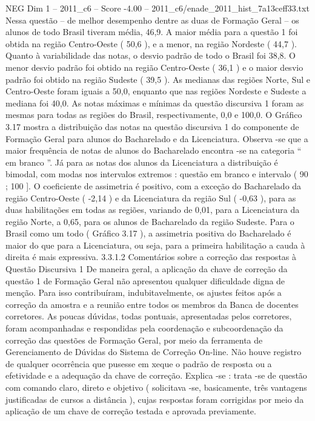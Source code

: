 \begin{textsample}{NEG Dim 1 – 2011\_c6 – Score -4.00 – 2011\_c6/enade\_2011\_hist\_7a13ceff33.txt}
Nessa questão – de melhor desempenho dentre as duas de Formação Geral – os alunos de todo Brasil tiveram média, 46,9.
A maior média para a questão 1 foi obtida na região Centro-Oeste ( 50,6 ), e a menor, na região Nordeste ( 44,7 ).
Quanto à variabilidade das notas, o desvio padrão de todo o Brasil foi 38,8.
O menor desvio padrão foi obtido na região Centro-Oeste ( 36,1 ) e o maior desvio padrão foi obtido na região Sudeste ( 39,5 ).
As medianas das regiões Norte, Sul e Centro-Oeste foram iguais a 50,0, enquanto que nas regiões Nordeste e Sudeste a mediana foi 40,0.
As notas máximas e mínimas da questão discursiva 1 foram as mesmas para todas as regiões do Brasil, respectivamente, 0,0 e 100,0.
O Gráfico 3.17 mostra a distribuição das notas na questão discursiva 1 do componente de Formação Geral para alunos do Bacharelado e da Licenciatura.
Observa -se que a maior frequência de notas de alunos do Bacharelado encontra -se na categoria “ em branco ”.
Já para as notas dos alunos da Licenciatura a distribuição é bimodal, com modas nos intervalos extremos : questão em branco e intervalo ( 90 ; 100 ].
O coeficiente de assimetria é positivo, com a exceção do Bacharelado da região Centro-Oeste ( -2,14 ) e da Licenciatura da região Sul ( -0,63 ), para as duas habilitações em todas as regiões, variando de 0,01, para a Licenciatura da região Norte, a 0,65, para os alunos de Bacharelado da região Sudeste.
Para o Brasil como um todo ( Gráfico 3.17 ), a assimetria positiva do Bacharelado é maior do que para a Licenciatura, ou seja, para a primeira habilitação a cauda à direita é mais expressiva. 3.3.1.2 Comentários sobre a correção das respostas à Questão Discursiva 1 De maneira geral, a aplicação da chave de correção da questão 1 de Formação Geral não apresentou qualquer dificuldade digna de menção.
Para isso contribuíram, indubitavelmente, os ajustes feitos após a correção da amostra e a reunião entre todos os membros da Banca de docentes corretores.
As poucas dúvidas, todas pontuais, apresentadas pelos corretores, foram acompanhadas e respondidas pela coordenação e subcoordenação da correção das questões de Formação Geral, por meio da ferramenta de Gerenciamento de Dúvidas do Sistema de Correção On-line.
Não houve registro de qualquer ocorrência que pusesse em xeque o padrão de resposta ou a efetividade e a adequação da chave de correção.
Explica -se : trata -se de questão com comando claro, direto e objetivo ( solicitava -se, basicamente, três vantagens justificadas de cursos a distância ), cujas respostas foram corrigidas por meio da aplicação de um chave de correção testada e aprovada previamente.

\end{textsample}
